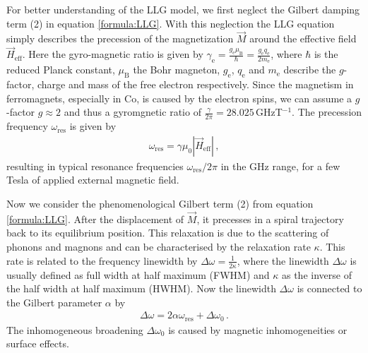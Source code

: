 For better understanding of the LLG model, we first neglect the Gilbert damping term (2) in equation \ref{formula:LLG}. With this neglection the LLG equation simply describes the precession of the magnetization $\vec{M}$ around the effective field $\vec{H}_\text{eff}$. Here the gyro-magnetic ratio is given by $\gamma_\text{e}=\frac{g_\text{e}\mu_\text{B}}{\hbar}=\frac{g_\text{e}q_\text{e}}{2m_\text{e}}$, where $\hbar$ is the reduced Planck constant, $\mu_\text{B}$ the Bohr magneton, $g_\text{e}$, $q_\text{e}$ and $m_\text{e}$ describe the $g$-factor, charge and mass of the free electron respectively. Since the magnetism in ferromagnets, especially in Co, is caused by the electron spins, we can assume a $g$-factor $g\approx 2$ and thus a gyromgnetic ratio of $\frac{\gamma}{2\pi}=28.025$\,GHzT$^{-1}$.
The precession frequency $\omega_\text{res}$ is given by
\begin{align}
    \omega_\text{res}=\gamma\mu_0|\vec{H}_\text{eff}|\,,
\end{align}
resulting in typical resonance frequencies $\omega_\text{res}/2\pi$ in the GHz range, for a few Tesla of applied external magnetic field.

Now we consider the phenomenological Gilbert term (2) from equation \ref{formula:LLG}. After the displacement of $\vec{M}$, it precesses in a spiral trajectory back to its equilibrium position. This relaxation is due to the scattering of phonons and magnons and can be characterised by the relaxation rate $\kappa$. This rate is related to the frequency linewidth by $\Delta\omega=\frac{1}{2\kappa}$, where the linewidth $\Delta\omega$ is usually defined as full width at half maximum (FWHM) and $\kappa$ as the inverse of the half width at half maximum (HWHM).
Now the linewidth $\Delta\omega$ is  connected to the Gilbert parameter $\alpha$ by
\begin{align}
    \Delta\omega=2\alpha\omega_\text{res}+\Delta\omega_0\,.
\end{align}
The inhomogeneous broadening $\Delta\omega_0$ is caused by magnetic inhomogeneities or surface effects. \cite{Beaujour2009}

